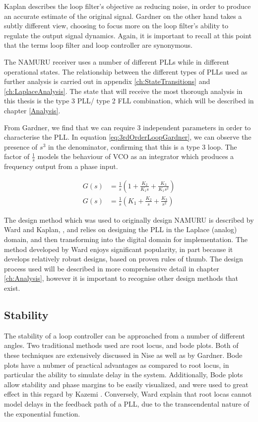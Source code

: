 	Kaplan describes the loop filter's objective as reducing noise, in order to produce an accurate estimate of the original signal\cite{Kaplan}. Gardner on the other hand takes a subtly different view, choosing to focus more on the loop filter's ability to regulate the output signal dynamics\cite{Gardner}. Again, it is important to recall at this point that the terms loop filter and loop controller are synonymous. 
	
	
	The \ac{NAMURU} receiver uses a number of different PLLs while in different operational states. The relationship between the different types of PLLs used as further analysis is carried out in appendix \ref{ch:StateTransitions} and \ref{ch:LaplaceAnalysis}. The state that will receive the most thorough analysis in this thesis is the type 3 PLL/ type 2 FLL combination, which will be described in chapter \ref{Analysis}. 
	
	
	From Gardner, we find that we can require 3 independent parameters in order to characterise the PLL\cite{Gardner}. In equation \ref{eq:3rdOrderLoopGardner}, we can observe the presence of $s^3$ in the denominator, confirming that this is a type 3 loop. The factor of $\frac{1}{s}$ models the behaviour of \ac{VCO} as an integrator which produces a frequency output from a phase input. 
	
	
	\begin{align}
	G(s) &= \frac{1}{s}(1 + \frac{K_2}{K_1s} + \frac{K_3}{K_1s^2})\\
	G(s) &= \frac{1}{s}(K_1 + \frac{K_2}{s} + \frac{K_3}{s^2})
	\label{eq:3rdOrderLoopGardner}
	\end{align}

	The design method which was used to originally design \ac{NAMURU} is described by Ward and Kaplan, \cite{Ward,Kaplan}, and relies on designing the PLL in the Laplace (analog) domain, and then transforming into the digital domain for implementation. The method developed by Ward enjoys significant popularity, in part because it develops relatively robust designs, based on proven rules of thumb. The design process used will be described in more comprehensive detail in chapter \ref{ch:Analysis}, however it is important to recognise other design methods that exist. 
	
	\subsection{Stability}
	The stability of a loop controller can be approached from a number of different angles. Two traditional methods used are root locus, and bode plots. Both of these techniques are extensively discussed in Nise as well as by Gardner\cite{Nise,Gardner}. Bode plots have a nubmer of practical advantages as compared to root locus, in particular the ability to simulate delay in the system. Additionally, Bode plots allow stability and phase margins to be easily visualized, and were used to great effect in this regard by Kazemi \cite{KazemiPHD}.  Conversely, Ward explain that root locas cannot model delays in the feedback path of a PLL, due to the transcendental nature of the exponential function.

